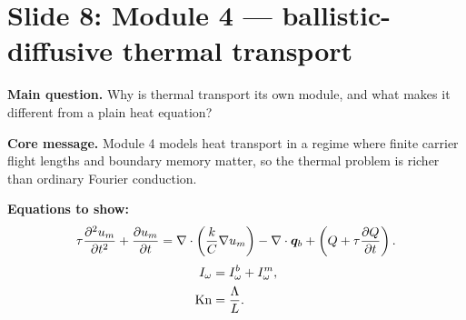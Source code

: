 \documentclass[11pt]{article}
\begin{document}
\section{Slide 8: Module 4 --- ballistic-diffusive thermal transport}
\begin{physicsbox}
\textbf{Main question.} Why is thermal transport its own module, and what makes it different from a plain heat equation?
\end{physicsbox}

\textbf{Core message.} Module 4 models heat transport in a regime where finite carrier flight lengths and boundary memory matter, so the thermal problem is richer than ordinary Fourier conduction.

\textbf{Equations to show:}
\begin{equation*}
\tau\frac{\partial^2 u_m}{\partial t^2}+\frac{\partial u_m}{\partial t}
=\nabla\cdot\left(\frac{k}{C}\nabla u_m\right)-\nabla\cdot\bm{q}_b
+\left(Q+\tau\frac{\partial Q}{\partial t}\right).
\end{equation*}
\begin{align*}
I_\omega &= I^b_\omega+I^m_\omega,\\
\mathrm{Kn} &= \frac{\Lambda}{L}.
\end{align*}
\end{document}
